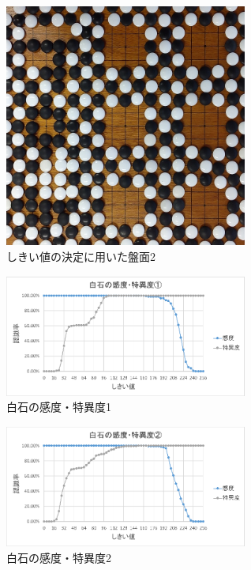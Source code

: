 \documentclass[openright]{nitocs}
\numberwithin{equation}{section}
\begin{document}
            \begin{figure}[tb] %
                \begin{center}
                \includegraphics[clip,width=80mm]{DSC_0100/boardImg.jpg} 
                \caption{しきい値の決定に用いた盤面2}
                \label{DSC0100}
                \end{center}
            \end{figure}

            \begin{figure}[tb] %
                \begin{center}
                \includegraphics[clip,width=80mm]{Case1_White_TPF_TNF.eps} 
                \caption{白石の感度・特異度1}
                \label{Case1White}
                \end{center}
            \end{figure}
            
            \begin{figure}[tb] %
                \begin{center}
                \includegraphics[clip,width=80mm]{Case2_White_TPF_TNF.eps} 
                \caption{白石の感度・特異度2}
                \label{Case2White}
                \end{center}
            \end{figure}
\end{document}
